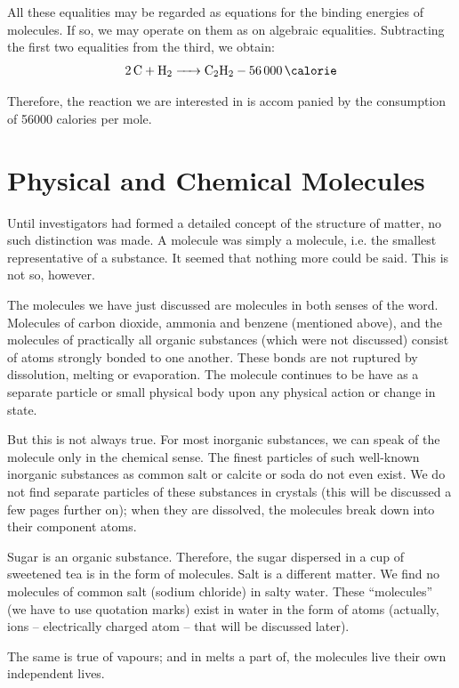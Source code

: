 All these equalities may be regarded as equations for the binding energies of molecules. If so, we may operate on them as on algebraic equalities. Subtracting the first two equalities from the third, we obtain:
\begin{equation*}%
\ce{2C + H2 -> C2H2 - \SI{56000}{\calorie}}
\end{equation*}

Therefore, the reaction we are interested in is accom­ panied by the consumption of \num{56000} calories per mole.

\section{Physical and Chemical Molecules}

Until investigators had formed a detailed concept of the structure of matter, no such distinction was made. A molecule was simply a molecule, i.e. the smallest representative of a substance. It seemed that nothing more could be said. This is not so, however.

The molecules we have just discussed are molecules in both senses of the word. Molecules of carbon dioxide, ammonia and benzene (mentioned above), and the mol­ecules of practically all organic substances (which were not discussed) consist of atoms strongly bonded to one another. These bonds are not ruptured by dissolution, melting or evaporation. The molecule continues to be­ have as a separate particle or small physical body upon any physical action or change in state.

But this is not always true. For most inorganic sub­stances, we can speak of the molecule only in the chem­ical sense. The finest particles of such well-known inorganic substances as common salt or calcite or soda do not even exist. We do not find separate particles of these substances in crystals (this will be discussed a few pages further on); when they are dissolved, the molecules break down into their component atoms.

Sugar is an organic substance. Therefore, the sugar dispersed in a cup of sweetened tea is in the form of molecules. Salt is a different matter. We find no molecules of common salt (sodium chloride) in salty water. These ``molecules'' (we have to use quotation marks) exist in water in the form of atoms (actually, ions -- electrically charged atom -- that will be discussed later).

The same is true of vapours; and in melts a part of, the molecules live their own independent lives. 

